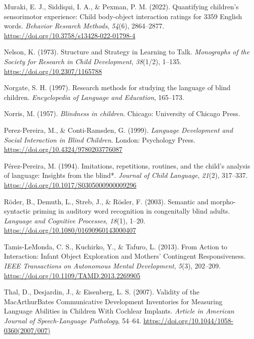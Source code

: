 \documentclass[english,man,floatsintext]{apa6}
\begin{document}
\leavevmode\hypertarget{ref-muraki2022}{}%
Muraki, E. J., Siddiqui, I. A., \& Pexman, P. M. (2022). Quantifying children's sensorimotor experience: Child body-object interaction ratings for 3359 English words. \emph{Behavior Research Methods}, \emph{54}(6), 2864--2877. \url{https://doi.org/10.3758/s13428-022-01798-4}

\leavevmode\hypertarget{ref-nelson1973}{}%
Nelson, K. (1973). Structure and Strategy in Learning to Talk. \emph{Monographs of the Society for Research in Child Development}, \emph{38}(1/2), 1--135. \url{https://doi.org/10.2307/1165788}

\leavevmode\hypertarget{ref-norgate1997}{}%
Norgate, S. H. (1997). Research methods for studying the language of blind children. \emph{Encyclopedia of Language and Education}, 165--173.

\leavevmode\hypertarget{ref-norris1957}{}%
Norris, M. (1957). \emph{Blindness in children}. Chicago: University of Chicago Press.

\leavevmode\hypertarget{ref-perez-pereira1999}{}%
Perez-Pereira, M., \& Conti-Ramsden, G. (1999). \emph{Language Development and Social Interaction in Blind Children}. London: Psychology Press. \url{https://doi.org/10.4324/9780203776087}

\leavevmode\hypertarget{ref-perez-pereira1994}{}%
Pérez-Pereira, M. (1994). Imitations, repetitions, routines, and the child's analysis of language: Insights from the blind*. \emph{Journal of Child Language}, \emph{21}(2), 317--337. \url{https://doi.org/10.1017/S0305000900009296}

\leavevmode\hypertarget{ref-roder2003}{}%
Röder, B., Demuth, L., Streb, J., \& Rösler, F. (2003). Semantic and morpho-syntactic priming in auditory word recognition in congenitally blind adults. \emph{Language and Cognitive Processes}, \emph{18}(1), 1--20. \url{https://doi.org/10.1080/01690960143000407}

\leavevmode\hypertarget{ref-tamis-lemonda2013}{}%
Tamis-LeMonda, C. S., Kuchirko, Y., \& Tafuro, L. (2013). From Action to Interaction: Infant Object Exploration and Mothers' Contingent Responsiveness. \emph{IEEE Transactions on Autonomous Mental Development}, \emph{5}(3), 202--209. \url{https://doi.org/10.1109/TAMD.2013.2269905}

\leavevmode\hypertarget{ref-thal2007}{}%
Thal, D., Desjardin, J., \& Eisenberg, L. S. (2007). Validity of the MacArthurBates Communicative Development Inventories for Measuring Language Abilities in Children With Cochlear Implants. \emph{Article in American Journal of Speech-Language Pathology}, 54--64. \url{https://doi.org/10.1044/1058-0360(2007/007)}
\end{document}
